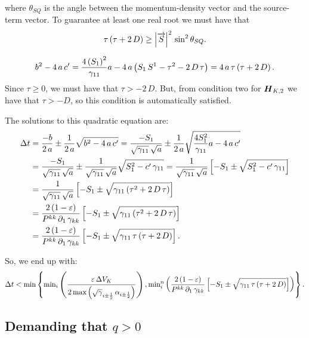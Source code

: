 where $\theta_{SQ}$ is the angle between the momentum-density vector and the source-term vector. To guarantee at least one real root we must have that
\begin{equation}
    \tau\left(\tau+2\,D\right)\geq\left|\overrightarrow{S}\right|^{2}\,\sin^{2}\theta_{SQ}.
\end{equation}

\newpage
\begin{equation}
    b^{2}-4\,a\,c'=\frac{4\left(S_{1}\right)^{2}}{\gamma_{11}}a-4\,a\left(S_{1}\,S^{1}-\tau^{2}-2\,D\,\tau\right)=4\,a\,\tau\left(\tau+2\,D\right).
\end{equation}
Since $\tau\geq0$, we must have that $\tau>-2\,D$. But, from condition two for $\boldsymbol{H}_{K,2}$ we have that $\tau>-D$, so this condition is automatically satisfied.

The solutions to this quadratic equation are:
\begin{align}
    \Delta t&=\frac{-b}{2\,a}\pm\frac{1}{2\,a}\sqrt{b^{2}-4\,a\,c'}=\frac{-S_{1}}{\sqrt{\gamma_{11}}\,\sqrt{a}}\pm\frac{1}{2\,a}\sqrt{\frac{4S_{1}^{2}}{\gamma_{11}}a-4\,a\,c'}\\
    &=\frac{-S_{1}}{\sqrt{\gamma_{11}}\,\sqrt{a}}\pm\frac{1}{\sqrt{\gamma_{11}}\,\sqrt{a}}\sqrt{S_{1}^{2}-c'\,\gamma_{11}}=\frac{1}{\sqrt{\gamma_{11}}\,\sqrt{a}}\left[-S_{1}\pm\sqrt{S_{1}^{2}-c'\,\gamma_{11}}\right]\\
    &=\frac{1}{\sqrt{\gamma_{11}}\,\sqrt{a}}\left[-S_{1}\pm\sqrt{\gamma_{11}\left(\tau^{2}+2\,D\,\tau\right)}\right]\\
    &=\frac{2\left(1-\varepsilon\right)}{P^{kk}\,\partial_{1}\,\gamma_{kk}}\left[-S_{1}\pm\sqrt{\gamma_{11}\left(\tau^{2}+2\,D\,\tau\right)}\right]\\
    &=\frac{2\left(1-\varepsilon\right)}{P^{kk}\,\partial_{1}\,\gamma_{kk}}\left[-S_{1}\pm\sqrt{\gamma_{11}\,\tau\left(\tau+2\,D\right)}\right].
\end{align}

So, we end up with:
\begin{equation}
    \Delta t<\text{min}\left\{\text{min}_{i}\left(\frac{\varepsilon\,\Delta V_{K}}{2\,\text{max}\left(\sqrt{\gamma}_{i\pm\frac{1}{2}}\,\alpha_{i\pm\frac{1}{2}}\right)}\right),\text{min}^{n}_{i}\left(\frac{2\left(1-\varepsilon\right)}{P^{kk}\,\partial_{1}\,\gamma_{kk}}\left[-S_{1}\pm\sqrt{\gamma_{11}\,\tau\left(\tau+2\,D\right)}\right]\right)\right\}.
\end{equation}

\subsection{Demanding that $q>0$}

